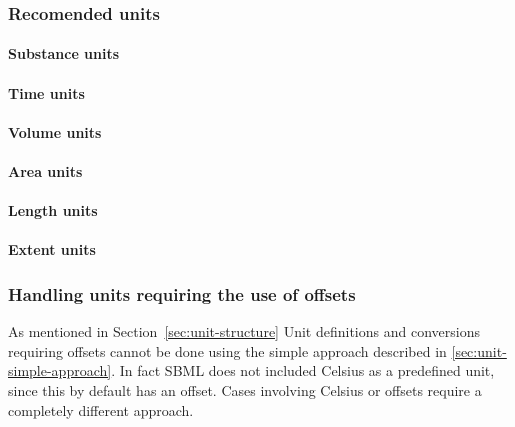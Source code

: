 \subsubsection{Recomended units}
\label{sec:bp:unitdefinitions:recommendedunits}

\paragraph{Substance units}
\label{sec:bp:unitdefinitions:recommendedunits:substanceUnits}

\paragraph{Time units}
\label{sec:bp:unitdefinitions:recommendedunits:timeUnits}

\paragraph{Volume units}
\label{sec:bp:unitdefinitions:recommendedunits:volumeUnits}

\paragraph{Area units}
\label{sec:bp:unitdefinitions:recommendedunits:areaUnits}

\paragraph{Length units}
\label{sec:bp:unitdefinitions:recommendedunits:lengthUnits}

\paragraph{Extent units}
\label{sec:bp:unitdefinitions:recommendedunits:extentUnits}

\subsubsection{Handling units requiring the use of offsets}
\label{sec:bp:unitdefinitions:offset}

As mentioned in Section~\ref{sec:unit-structure} Unit definitions and conversions 
requiring offsets cannot be done using the simple approach described 
in \ref{sec:unit-simple-approach}.  In fact SBML does not included 
Celsius as a predefined unit, since this by default has an offset.
Cases involving Celsius or offsets require a completely
different approach.

